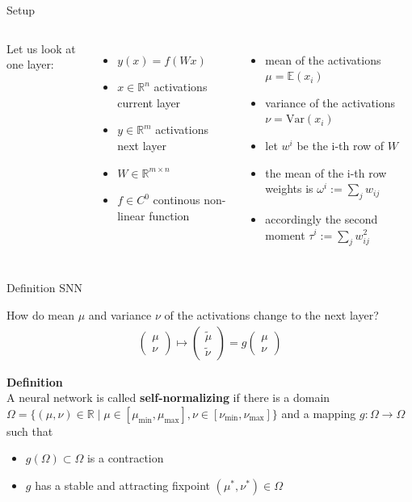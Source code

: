 \documentclass[aspectratio=169]{beamer}
\begin{document}
\begin{frame}{Setup}
\begin{columns}[t]
	Let us look at one layer:
	\begin{itemize}
	\item $ y(x) = f(W x ) $ 
	\item $x \in \mathbb{R}^{n}$ activations current layer
	\item $y \in \mathbb{R}^{m}$ activations next layer
	\item $W \in  \mathbb{R}^{m \times n}$
	\item $f \in C^{0} $ continous non-linear function
	\end{itemize}

	\begin{itemize}
	\item mean of the activations $ \mu = \mathbb{E}(x_i)$
	\item variance of the activations $ \nu = \text{Var} (x_i) $
	\item let $w^i$ be the i-th row of $W$
	\item the mean of the i-th row weights is $\omega^i := \sum_{j} w_{i j} $
	\item accordingly the second moment $\tau^i := \sum_{j} w_{i j}^2$
	\end{itemize}

\end{columns}

\end{frame}

\begin{frame}{Definition SNN}

How do mean $\mu$ and variance $\nu$ of the activations change to the next layer?
\begin{align*}
\begin{pmatrix} \mu \\  \nu \end{pmatrix}
\mapsto 
\begin{pmatrix} \tilde{\mu} \\  \tilde{\nu} \end{pmatrix}
= g \begin{pmatrix} \mu \\  \nu \end{pmatrix}
\end{align*}


\textbf{Definition}
\\
A neural network is called \textbf{self-normalizing} if there is a domain 
$ \Omega = \{ (\mu, \nu) \in \mathbb{R} \mid \mu \in [\mu_{\min}, \mu_{\max}], \nu \in [\nu_{\min}, \nu_{\max}] \} $ and a mapping $ g: \Omega \rightarrow \Omega$ such that
\begin{itemize}
\item $g(\Omega) \subset \Omega $ is a contraction
\item $g$ has a stable and attracting fixpoint $( \mu^*, \nu^*) \in \Omega $
\end{itemize}



\end{frame}
\end{document}
